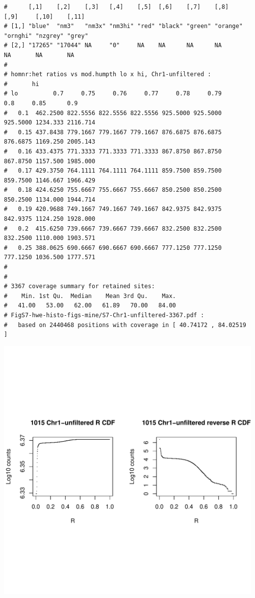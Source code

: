 \documentclass{article}\usepackage[]{graphicx}\usepackage[]{color}
\makeatletter
\def\maxwidth{ %
  \ifdim\Gin@nat@width>\linewidth
    \linewidth
  \else
    \Gin@nat@width
  \fi
}
\newenvironment{kframe}{%
 \def\at@end@of@kframe{}%
 \ifinner\ifhmode%
  \def\at@end@of@kframe{\end{minipage}}%
  \begin{minipage}{\columnwidth}%
 \fi\fi%
 \def\FrameCommand##1{\hskip\@totalleftmargin \hskip-\fboxsep
 \colorbox{shadecolor}{##1}\hskip-\fboxsep
     \hskip-\linewidth \hskip-\@totalleftmargin \hskip\columnwidth}%
 \MakeFramed {\advance\hsize-\width
   \@totalleftmargin\z@ \linewidth\hsize
   \@setminipage}}%
 {\par\unskip\endMakeFramed%
 \at@end@of@kframe}
\newenvironment{knitrout}{}{} %
\makeatother
\begin{document}
\begin{knitrout}
\begin{kframe}\begin{verbatim}
#      [,1]    [,2]    [,3]   [,4]    [,5]  [,6]    [,7]    [,8]     [,9]     [,10]    [,11] 
# [1,] "blue"  "nm3"   "nm3x" "nm3hi" "red" "black" "green" "orange" "ornghi" "nzgrey" "grey"
# [2,] "17265" "17044" NA     "0"     NA    NA      NA      NA       NA       NA       NA
# 
# homnr:het ratios vs mod.humpth lo x hi, Chr1-unfiltered :
#       hi
# lo          0.7     0.75     0.76     0.77     0.78     0.79      0.8     0.85      0.9
#   0.1  462.2500 822.5556 822.5556 822.5556 925.5000 925.5000 925.5000 1234.333 2116.714
#   0.15 437.8438 779.1667 779.1667 779.1667 876.6875 876.6875 876.6875 1169.250 2005.143
#   0.16 433.4375 771.3333 771.3333 771.3333 867.8750 867.8750 867.8750 1157.500 1985.000
#   0.17 429.3750 764.1111 764.1111 764.1111 859.7500 859.7500 859.7500 1146.667 1966.429
#   0.18 424.6250 755.6667 755.6667 755.6667 850.2500 850.2500 850.2500 1134.000 1944.714
#   0.19 420.9688 749.1667 749.1667 749.1667 842.9375 842.9375 842.9375 1124.250 1928.000
#   0.2  415.6250 739.6667 739.6667 739.6667 832.2500 832.2500 832.2500 1110.000 1903.571
#   0.25 388.0625 690.6667 690.6667 690.6667 777.1250 777.1250 777.1250 1036.500 1777.571
# 
# 
# 3367 coverage summary for retained sites:
#    Min. 1st Qu.  Median    Mean 3rd Qu.    Max. 
#   41.00   53.00   62.00   61.89   70.00   84.00 
# FigS7-hwe-histo-figs-mine/S7-Chr1-unfiltered-3367.pdf :
#   based on 2440468 positions with coverage in [ 40.74172 , 84.02519 ]
\end{verbatim}
\end{kframe}
\includegraphics[width=\maxwidth]{FigS7-hwe-histo-figs-knitr/unnamed-chunk-10-24} 

\end{knitrout}
\end{document}

